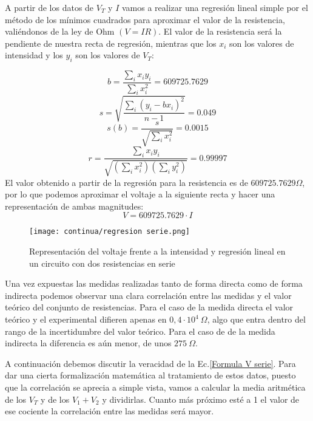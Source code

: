\documentclass[a4paper,12pt,titlepage]{article}
\begin{document}
\newpage A partir de los datos de $V_{T}$ y $I$ vamos a realizar una regresión lineal simple por el método de los mínimos cuadrados para aproximar el valor de la resistencia, valiéndonos de la ley de Ohm $(V=IR)$. El valor de la resistencia será la pendiente de nuestra recta de regresión, mientras que los $x_{i}$ son los valores de intensidad y los $y_{i}$ son los valores de $V_{T}$:

\begin{equation}
    b=\frac{\sum_{i}x_{i}y_{i}}{\sum_{i}x_{i}^2}=609725.7629
\end{equation}
\begin{equation}
    s=\sqrt{\frac{\sum_{i}(y_{i}-bx_{i})^2}{n-1}}=0.049
\end{equation}
\begin{equation}
    s(b)=\frac{s}{\sqrt{\sum_{i}x_{i}^2}}=0.0015
\end{equation}
\begin{equation}
    r=\frac{\sum_{i}x_{i}y_{i}}{\sqrt{(\sum_{i}x_{i}^2)(\sum_{i}y_{i}^2)}}=0.99997
\end{equation}
\newline
El valor obtenido a partir de la regresión para la resistencia es de $609725.7629 \Omega$, por lo que podemos aproximar el voltaje a la siguiente recta y hacer una representación de ambas magnitudes:
\begin{equation}
    V=609725.7629 \cdot I
\end{equation}

\begin{figure}[h!]
    \centering
    \texttt{[image: continua/regresion serie.png]}
    \caption{Representación del voltaje frente a la intensidad y regresión lineal en un circuito con dos resistencias en serie}
    \label{RegSerie}
\end{figure}

Una vez expuestas las medidas realizadas tanto de forma directa como de forma indirecta podemos observar una clara correlación entre las medidas y el valor teórico del conjunto de resistencias. Para el caso de la medida directa el valor teórico y el experimental difieren apenas en $0,4 \cdot 10^4 \: \Omega$, algo que entra dentro del rango de la incertidumbre del valor teórico. Para el caso de de la medida indirecta la diferencia es aún menor, de unos $275 \: \Omega$. 
\par A continuación debemos discutir la veracidad de la Ec.\ref{Formula V serie}. Para dar una cierta formalización matemática al tratamiento de estos datos, puesto que la correlación se aprecia a simple vista, vamos a calcular la media aritmética de los $V_{T}$ y de los $V_{1}+V_{2}$ y dividirlas. Cuanto más próximo esté a 1 el valor de ese cociente la correlación entre las medidas será mayor.
\end{document}
